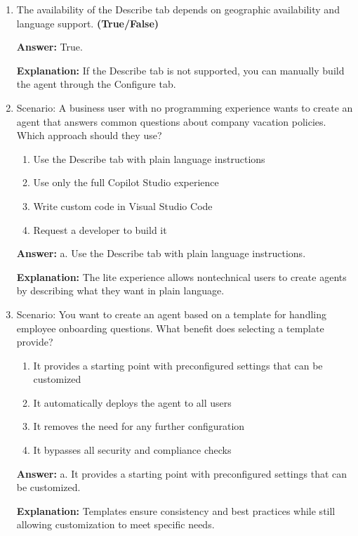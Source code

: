 \documentclass[10pt]{article}
\begin{document}
\begin{enumerate}[leftmargin=*]
\item The availability of the Describe tab depends on geographic availability and language support. \textbf{(True/False)}

\textbf{Answer:} True.

\textbf{Explanation:} If the Describe tab is not supported, you can manually build the agent through the Configure tab.

\item Scenario: A business user with no programming experience wants to create an agent that answers common questions about company vacation policies. Which approach should they use?
\begin{enumerate}[label=\alph*., leftmargin=1.5em]
\item Use the Describe tab with plain language instructions
\item Use only the full Copilot Studio experience
\item Write custom code in Visual Studio Code
\item Request a developer to build it
\end{enumerate}
\textbf{Answer:} a. Use the Describe tab with plain language instructions.

\textbf{Explanation:} The lite experience allows nontechnical users to create agents by describing what they want in plain language.

\item Scenario: You want to create an agent based on a template for handling employee onboarding questions. What benefit does selecting a template provide?
\begin{enumerate}[label=\alph*., leftmargin=1.5em]
\item It provides a starting point with preconfigured settings that can be customized
\item It automatically deploys the agent to all users
\item It removes the need for any further configuration
\item It bypasses all security and compliance checks
\end{enumerate}
\textbf{Answer:} a. It provides a starting point with preconfigured settings that can be customized.

\textbf{Explanation:} Templates ensure consistency and best practices while still allowing customization to meet specific needs.

\end{enumerate}
\clearpage
\end{document}
